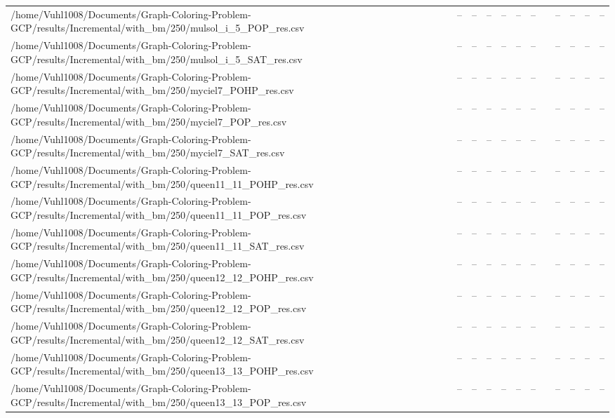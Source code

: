 \begin{table}[htbp]
\begin{tabular}{llllllllllll}
/home/Vuhl1008/Documents/Graph-Coloring-Problem-GCP/results/Incremental/with\_bm/250/mulsol\_i\_5\_POP\_res.csv & -- & -- & -- & -- & -- & -- & {} & -- & -- & -- & -- \\
/home/Vuhl1008/Documents/Graph-Coloring-Problem-GCP/results/Incremental/with\_bm/250/mulsol\_i\_5\_SAT\_res.csv & -- & -- & -- & -- & -- & -- & {} & -- & -- & -- & -- \\
/home/Vuhl1008/Documents/Graph-Coloring-Problem-GCP/results/Incremental/with\_bm/250/myciel7\_POHP\_res.csv & -- & -- & -- & -- & -- & -- & {} & -- & -- & -- & -- \\
/home/Vuhl1008/Documents/Graph-Coloring-Problem-GCP/results/Incremental/with\_bm/250/myciel7\_POP\_res.csv & -- & -- & -- & -- & -- & -- & {} & -- & -- & -- & -- \\
/home/Vuhl1008/Documents/Graph-Coloring-Problem-GCP/results/Incremental/with\_bm/250/myciel7\_SAT\_res.csv & -- & -- & -- & -- & -- & -- & {} & -- & -- & -- & -- \\
/home/Vuhl1008/Documents/Graph-Coloring-Problem-GCP/results/Incremental/with\_bm/250/queen11\_11\_POHP\_res.csv & -- & -- & -- & -- & -- & -- & {} & -- & -- & -- & -- \\
/home/Vuhl1008/Documents/Graph-Coloring-Problem-GCP/results/Incremental/with\_bm/250/queen11\_11\_POP\_res.csv & -- & -- & -- & -- & -- & -- & {} & -- & -- & -- & -- \\
/home/Vuhl1008/Documents/Graph-Coloring-Problem-GCP/results/Incremental/with\_bm/250/queen11\_11\_SAT\_res.csv & -- & -- & -- & -- & -- & -- & {} & -- & -- & -- & -- \\
/home/Vuhl1008/Documents/Graph-Coloring-Problem-GCP/results/Incremental/with\_bm/250/queen12\_12\_POHP\_res.csv & -- & -- & -- & -- & -- & -- & {} & -- & -- & -- & -- \\
/home/Vuhl1008/Documents/Graph-Coloring-Problem-GCP/results/Incremental/with\_bm/250/queen12\_12\_POP\_res.csv & -- & -- & -- & -- & -- & -- & {} & -- & -- & -- & -- \\
/home/Vuhl1008/Documents/Graph-Coloring-Problem-GCP/results/Incremental/with\_bm/250/queen12\_12\_SAT\_res.csv & -- & -- & -- & -- & -- & -- & {} & -- & -- & -- & -- \\
/home/Vuhl1008/Documents/Graph-Coloring-Problem-GCP/results/Incremental/with\_bm/250/queen13\_13\_POHP\_res.csv & -- & -- & -- & -- & -- & -- & {} & -- & -- & -- & -- \\
/home/Vuhl1008/Documents/Graph-Coloring-Problem-GCP/results/Incremental/with\_bm/250/queen13\_13\_POP\_res.csv & -- & -- & -- & -- & -- & -- & {} & -- & -- & -- & -- \\

\end{tabular}
\end{table}
